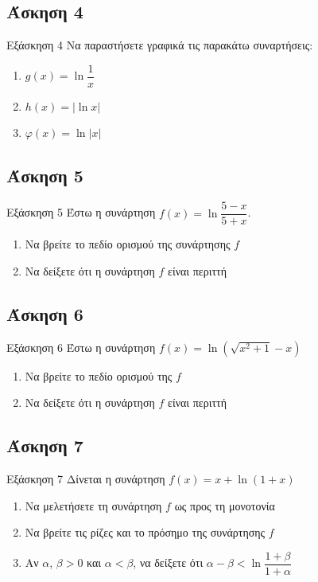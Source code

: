 \documentclass[greek]{beamer}
\begin{document}
\subsection{Άσκηση 4}
\begin{frame}[label=Άσκηση4,t]{Εξάσκηση 4}
  Να παραστήσετε γραφικά τις παρακάτω συναρτήσεις:
  \begin{enumerate}
    \item<1-> $g(x)=\ln \dfrac{1}{x}$
    \item<2-> $h(x)=|\ln x|$
    \item<3-> $φ(x)=\ln |x|$
  \end{enumerate}

\end{frame}

\subsection{Άσκηση 5}
\begin{frame}[label=Άσκηση5,t]{Εξάσκηση 5}
  Έστω η συνάρτηση $f(x)=\ln \dfrac{5-x}{5+x}$.
  \begin{enumerate}
    \item<1-> Να βρείτε το πεδίο ορισμού της συνάρτησης $f$
    \item<2-> Να δείξετε ότι η συνάρτηση $f$ είναι περιττή
  \end{enumerate}

\end{frame}

\subsection{Άσκηση 6}
\begin{frame}[label=Άσκηση6,t]{Εξάσκηση 6}
  Έστω η συνάρτηση $f(x)=\ln \left( \sqrt{x^2+1}-x \right) $
  \begin{enumerate}
    \item<1-> Να βρείτε το πεδίο ορισμού της $f$
    \item<2-> Να δείξετε ότι η συνάρτηση $f$ είναι περιττή
  \end{enumerate}

\end{frame}

\subsection{Άσκηση 7}
\begin{frame}[label=Άσκηση7,t]{Εξάσκηση 7}
  Δίνεται η συνάρτηση $f(x)=x+\ln(1+x)$
  \begin{enumerate}
    \item<1-> Να μελετήσετε τη συνάρτηση $f$ ως προς τη μονοτονία
    \item<2-> Να βρείτε τις ρίζες και το πρόσημο της συνάρτησης $f$
    \item<3-> Αν $α$, $β>0$ και $α<β$, να δείξετε ότι $α-β<\ln \dfrac{1+β}{1+α}$
  \end{enumerate}

\end{frame}
\end{document}

